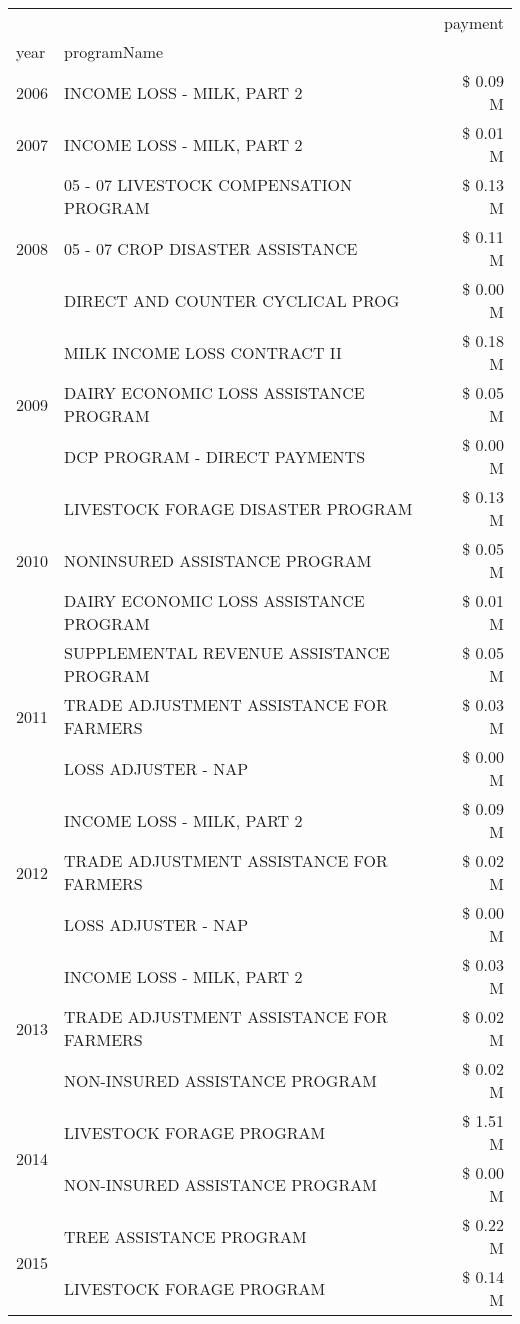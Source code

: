 \begin{tabular}{llr}
\toprule
 &  & payment \\
year & programName &  \\
\midrule
2006 & INCOME LOSS - MILK, PART 2 & \$ 0.09 M \\
\cline{1-3}
2007 & INCOME LOSS - MILK, PART 2 & \$ 0.01 M \\
\cline{1-3}
\multirow[t]{3}{*}{2008} & 05 - 07 LIVESTOCK COMPENSATION PROGRAM & \$ 0.13 M \\
 & 05 - 07 CROP DISASTER ASSISTANCE & \$ 0.11 M \\
 & DIRECT AND COUNTER CYCLICAL PROG & \$ 0.00 M \\
\cline{1-3}
\multirow[t]{3}{*}{2009} & MILK INCOME LOSS CONTRACT II & \$ 0.18 M \\
 & DAIRY ECONOMIC LOSS ASSISTANCE PROGRAM & \$ 0.05 M \\
 & DCP PROGRAM - DIRECT PAYMENTS & \$ 0.00 M \\
\cline{1-3}
\multirow[t]{3}{*}{2010} & LIVESTOCK FORAGE DISASTER  PROGRAM & \$ 0.13 M \\
 & NONINSURED ASSISTANCE PROGRAM & \$ 0.05 M \\
 & DAIRY ECONOMIC LOSS ASSISTANCE PROGRAM & \$ 0.01 M \\
\cline{1-3}
\multirow[t]{3}{*}{2011} & SUPPLEMENTAL REVENUE ASSISTANCE PROGRAM & \$ 0.05 M \\
 & TRADE ADJUSTMENT ASSISTANCE FOR FARMERS & \$ 0.03 M \\
 & LOSS ADJUSTER - NAP & \$ 0.00 M \\
\cline{1-3}
\multirow[t]{3}{*}{2012} & INCOME LOSS - MILK, PART 2 & \$ 0.09 M \\
 & TRADE ADJUSTMENT ASSISTANCE FOR FARMERS & \$ 0.02 M \\
 & LOSS ADJUSTER - NAP & \$ 0.00 M \\
\cline{1-3}
\multirow[t]{3}{*}{2013} & INCOME LOSS - MILK, PART 2 & \$ 0.03 M \\
 & TRADE ADJUSTMENT ASSISTANCE FOR FARMERS & \$ 0.02 M \\
 & NON-INSURED ASSISTANCE PROGRAM & \$ 0.02 M \\
\cline{1-3}
\multirow[t]{2}{*}{2014} & LIVESTOCK FORAGE PROGRAM & \$ 1.51 M \\
 & NON-INSURED ASSISTANCE PROGRAM & \$ 0.00 M \\
\cline{1-3}
\multirow[t]{3}{*}{2015} & TREE ASSISTANCE PROGRAM & \$ 0.22 M \\
 & LIVESTOCK FORAGE PROGRAM & \$ 0.14 M \\

\end{tabular}
